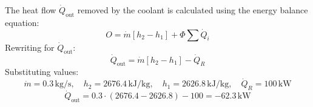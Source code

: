 The heat flow \( \dot{Q}_{\text{out}} \) removed by the coolant is calculated using the energy balance equation:  
\[
O = \dot{m} [h_2 - h_1] + \Phi \sum \dot{Q}_i
\]  
Rewriting for \( \dot{Q}_{\text{out}} \):  
\[
\dot{Q}_{\text{out}} = \dot{m} [h_2 - h_1] - \dot{Q}_R
\]  
Substituting values:  
\[
\dot{m} = 0.3 \, \text{kg/s}, \quad h_2 = 2676.4 \, \text{kJ/kg}, \quad h_1 = 2626.8 \, \text{kJ/kg}, \quad \dot{Q}_R = 100 \, \text{kW}
\]  
\[
\dot{Q}_{\text{out}} = 0.3 \cdot (2676.4 - 2626.8) - 100 = -62.3 \, \text{kW}
\]